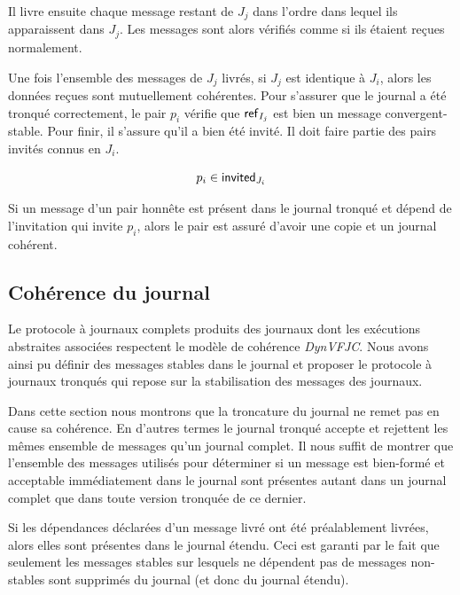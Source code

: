 Il livre ensuite chaque message restant de $J_j$ dans l'ordre dans lequel ils apparaissent dans $J_j$.
Les messages sont alors vérifiés comme si ils étaient reçues normalement.

Une fois l'ensemble des messages de $J_j$ livrés, si $J_j$ est identique à $J_i$, alors les données reçues sont mutuellement cohérentes.
Pour s'assurer que le journal a été tronqué correctement, le pair $p_i$ vérifie que $\operatorname{\mathsf{ref}}_{I_j}$ est bien un message convergent-stable.
Pour finir, il s'assure qu'il a bien été invité.
Il doit faire partie des pairs invités connus en $J_i$.

\begin{equation*}
    p_i \in \operatorname{\mathsf{invited}}_{J_i}
\end{equation*}

Si un message d'un pair honnête est présent dans le journal tronqué et dépend de l'invitation qui invite $p_i$, alors le pair est assuré d'avoir une copie et un journal cohérent.


\subsection{Cohérence du journal}

Le protocole à journaux complets produits des journaux dont les exécutions abstraites associées respectent le modèle de cohérence \emph{DynVFJC}.
Nous avons ainsi pu définir des messages stables dans le journal et proposer le protocole à journaux tronqués qui repose sur la stabilisation des messages des journaux.

Dans cette section nous montrons que la troncature du journal ne remet pas en cause sa cohérence.
En d'autres termes le journal tronqué accepte et rejettent les mêmes ensemble de messages qu'un journal complet.
Il nous suffit de montrer que l'ensemble des messages utilisés pour déterminer si un message est bien-formé et acceptable immédiatement dans le journal sont présentes autant dans un journal complet que dans toute version tronquée de ce dernier.

Si les dépendances déclarées d'un message livré ont été préalablement livrées, alors elles sont présentes dans le journal étendu.
Ceci est garanti par le fait que seulement les messages stables sur lesquels ne dépendent pas de messages non-stables sont supprimés du journal (et donc du journal étendu).

